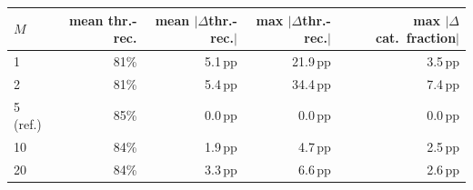 \begin{tabular}{lrrrr}
\toprule
$M$ & mean thr.-rec. & mean $|\Delta$thr.-rec.$|$ & max $|\Delta$thr.-rec.$|$ & max $|\Delta$cat.\ fraction$|$ \\
\midrule
1 & 81\% & 5.1\,pp & 21.9\,pp & 3.5\,pp \\
2 & 81\% & 5.4\,pp & 34.4\,pp & 7.4\,pp \\
5 (ref.) & 85\% & 0.0\,pp & 0.0\,pp & 0.0\,pp \\
10 & 84\% & 1.9\,pp & 4.7\,pp & 2.5\,pp \\
20 & 84\% & 3.3\,pp & 6.6\,pp & 2.6\,pp \\
\bottomrule
\end{tabular}
